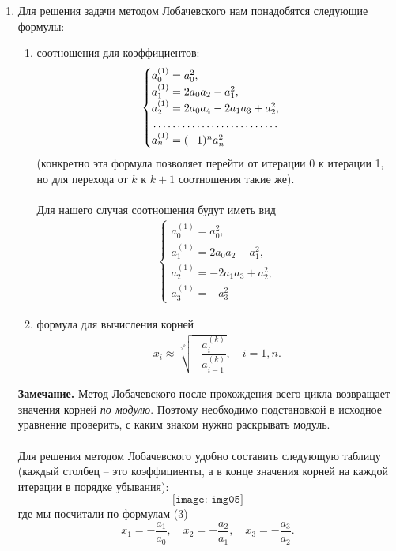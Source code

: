 \documentclass[a4paper, 12pt]{article}
\begin{document}
\begin{enumerate}
		 \newpage
		 \item 
		 \hypertarget{t6}{}
		 Для решения задачи методом Лобачевского нам понадобятся следующие формулы:
		 \begin{enumerate}
		 	\item соотношения для коэффициентов: 
		 	\begin{eqnarray}
		 		\begin{cases}
		 			a_0^{(1)} = a_0^2,\\
		 			a_1^{(1)} =2a_0a_2 - a_1^2,\\
		 			a_2^{(1)} = 2a_0a_4 - 2a_1a_3 + a_2^2,\\
		 			\dotfill\\
		 			a_n^{(1)} = (-1)^na_n^2
		 		\end{cases}
		 	\end{eqnarray}
		 	(конкретно эта формула позволяет перейти от итерации 0 к итерации 1, но для перехода от $k$ к $k+1$ соотношения такие же).\\\\
		 	Для нашего случая соотношения будут иметь вид
		 	\begin{eqnarray}
		 		\begin{cases}
		 			a_0^{(1)} = a_0^2,\\
		 			a_1^{(1)} =2a_0a_2 - a_1^2,\\
		 			a_2^{(1)} = - 2a_1a_3 + a_2^2,\\
		 			a_3^{(1)} = -a_3^2
		 		\end{cases}
		 	\end{eqnarray}
		 	\item формула для вычисления корней \begin{eqnarray}
		 		x_i\approx\sqrt[2^k]{ - \dfrac{a_i^{(k)}}{a_{i-1}^{(k)}}},\quad i =\overline{1,n}.
		 	\end{eqnarray}
		 \end{enumerate} 
		 \textbf{Замечание.} Метод Лобачевского после прохождения всего цикла возвращает значения корней \textit{по модулю}. Поэтому необходимо подстановкой в исходное уравнение проверить, с каким знаком нужно раскрывать модуль.\\\\
		 Для решения методом Лобачевского удобно составить следующую таблицу (каждый столбец -- это коэффициенты, а в конце значения корней на каждой итерации в порядке убывания):
		 $$
		 \texttt{[image: img05]}
		 $$
		 где мы посчитали по формулам (3) $$x_1 = - \dfrac{a_1}{a_0},\quad x_2 = - \dfrac{a_2}{a_1}, \quad x_3 = - \dfrac{a_3}{a_2}.$$

\end{enumerate}
\end{document}
